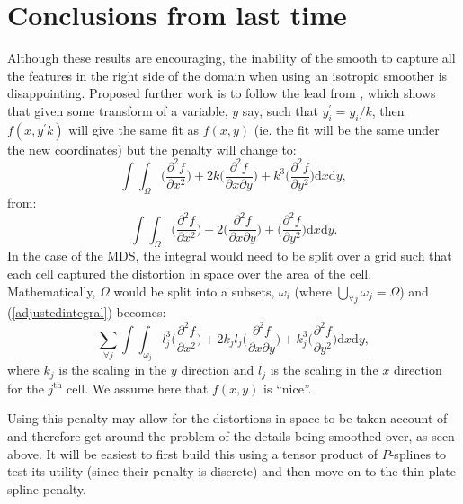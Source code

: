 \documentclass[a4paper,10pt]{article}
\begin{document}
\section{Conclusions from last time}

Although these results are encouraging, the inability of the smooth to capture all the features in the right side of the domain when using an isotropic smoother is disappointing. Proposed further work is to follow the lead from \cite{wood2000}, which shows that given some transform of a variable, $y$ say, such that $y_i^\prime=y_i/k$, then $f(x,y^\prime k)$ will give the same fit as $f(x,y)$ (ie. the fit will be the same under the new coordinates) but the penalty will change to:
\begin{equation}
\int\int_\Omega \Big( \frac{\partial^2 f}{\partial x^2} \Big) + 2k\Big( \frac{\partial^2 f}{\partial x \partial y} \Big) + k^3\Big( \frac{\partial^2 f}{\partial y^2} \Big) \text{d}x \text{d}y,
\label{adjustedintegral}
\end{equation}
from:
\begin{equation*}
\int\int_\Omega \Big( \frac{\partial^2 f}{\partial x^2} \Big) + 2\Big( \frac{\partial^2 f}{\partial x \partial y} \Big) + \Big( \frac{\partial^2 f}{\partial y^2} \Big) \text{d}x \text{d}y.
\end{equation*}
In the case of the MDS, the integral would need to be split over a grid such that each cell captured the distortion in space over the area of the cell. Mathematically, $\Omega$ would be split into a subsets, $\omega_i$ (where $\bigcup_{\forall j} \omega_j = \Omega$) and (\ref{adjustedintegral}) becomes:
\begin{equation}
\sum_{\forall j} \int\int_{\omega_j} l_j^3 \Big( \frac{\partial^2 f}{\partial x^2} \Big) + 2k_jl_j\Big( \frac{\partial^2 f}{\partial x \partial y} \Big) + k_j^3\Big( \frac{\partial^2 f}{\partial y^2} \Big) \text{d}x \text{d}y,
\end{equation}
where $k_j$ is the scaling in the $y$ direction and $l_j$ is the scaling in the $x$ direction for the $j^{\text{th}}$ cell. We assume here that $f(x,y)$ is ``nice''.

Using this penalty may allow for the distortions in space to be taken account of and therefore get around the problem of the details being smoothed over, as seen above. It will be easiest to first build this using a tensor product of $P$-splines to test its utility (since their penalty is discrete) and then move on to the thin plate spline penalty.
\end{document}
